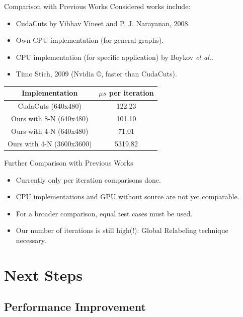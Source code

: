\documentclass{beamer}
\begin{document}
\begin{frame}{Comparison with Previous Works}
Considered works include:
\begin{itemize}
\item
CudaCuts by Vibhav Vineet and P. J. Narayanan, 2008.
\item
Own CPU implementation (for general graphs).
\item
CPU implementation (for specific application) by Boykov \emph{et al.}.
\item
Timo Stich, 2009 (Nvidia \copyright, faster than CudaCuts).
\end{itemize}

 \begin{tabular}{|c|c|}
\hline
\textbf{Implementation} & \textbf{$\mu s$ per iteration} \\
\hline
CudaCuts (640x480) &  122.23 \\
Ours with 8-N (640x480) &  101.10  \\
Ours with 4-N (640x480) &  71.01  \\
Ours with 4-N (3600x3600) &  5319.82  \\
\hline
\end{tabular}
\end{frame}

\begin{frame}{Further Comparison with Previous Works}
\begin{itemize}
\item
Currently only per iteration comparisons done.
\item
CPU implementations and GPU without source are not yet comparable.
\item
For a broader comparison, equal test cases must be used.
\item
Our number of iterations is still high(!): \alert{Global Relabeling} technique necessary.
\end{itemize}
\end{frame}

\section{Next Steps}

\subsection{Performance Improvement}
\end{document}
